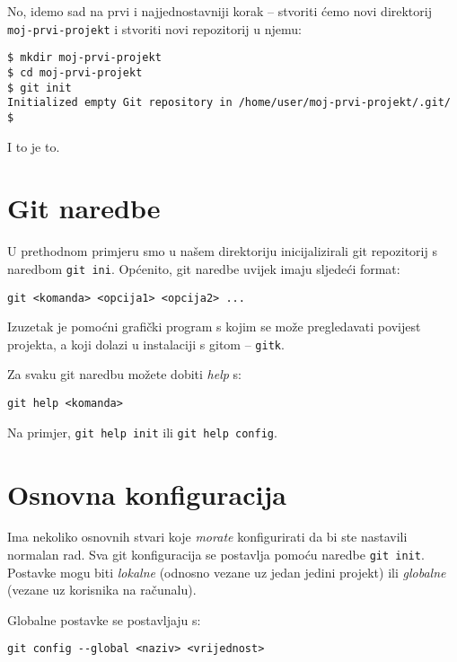 No, idemo sad na prvi i najjednostavniji korak -- stvoriti ćemo novi direktorij \verb+moj-prvi-projekt+ i stvoriti novi repozitorij u njemu:

\begin{verbatim}
$ mkdir moj-prvi-projekt
$ cd moj-prvi-projekt
$ git init
Initialized empty Git repository in /home/user/moj-prvi-projekt/.git/
$ 
\end{verbatim}

I to je to. 

\section*{Git naredbe}

U prethodnom primjeru smo u našem direktoriju inicijalizirali git repozitorij s naredbom \verb+git ini+.
Općenito, git naredbe uvijek imaju sljedeći format:

\begin{verbatim}
git <komanda> <opcija1> <opcija2> ...
\end{verbatim}

Izuzetak je pomoćni grafički program s kojim se može pregledavati povijest projekta, a koji dolazi u instalaciji s gitom -- \verb+gitk+.

Za svaku git naredbu možete dobiti \emph{help} s:

\begin{verbatim}
git help <komanda>
\end{verbatim}

Na primjer, \verb+git help init+ ili \verb+git help config+.

\section*{Osnovna konfiguracija}

Ima nekoliko osnovnih stvari koje \emph{morate} konfigurirati da bi ste nastavili normalan rad. 
Sva git konfiguracija se postavlja pomoću naredbe \verb+git init+. 
Postavke mogu biti \emph{lokalne} (odnosno vezane uz jedan jedini projekt) ili \emph{globalne} (vezane uz korisnika na računalu).

Globalne postavke se postavljaju s:

\begin{verbatim}
git config --global <naziv> <vrijednost>
\end{verbatim}

